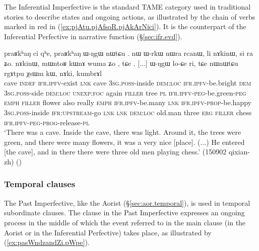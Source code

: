 The Inferential Imperfective is the standard TAME category used in traditional stories to describe states and ongoing actions, as illustrated by the chain of verbs marked in red in (\ref{ex:pjAtu.pjAfsoR.pjAkArNici}). It is the counterpart of the Inferential Perfective in narrative function  (§\ref{sec:ifr.evd}).

\begin{exe}
\ex \label{ex:pjAtu.pjAfsoR.pjAkArNici}
\gll praʁkʰaŋ ci  qʰe, praʁkʰaŋ ɯ-ŋgɯ nɯtɕu . nɯ ɯ-rkɯ nɯra rcanɯ, li nɤkinɯ, si ra  ʑo. nɤkinɯ, mɯntoʁ kɯnɤ wuma ʑo , tɕe . [...] ɯ-ŋgɯ lo-ɕe ri, tɕe nɯnɯtɕu rgɤtpu χsɯm kɯ, nɤki, kumbrɤl  \\
cave \textsc{indef} \textsc{ifr}.\textsc{ipfv}-exist \textsc{lnk} cave \textsc{3sg}.\textsc{poss}-inside \textsc{dem}:\textsc{loc} \textsc{ifr}.\textsc{ipfv}-be.bright \textsc{dem} \textsc{3sg}.\textsc{poss}-side \textsc{dem}:\textsc{loc} \textsc{unexp}:\textsc{foc} again \textsc{filler} tree \textsc{pl} \textsc{ifr}.\textsc{ipfv}-\textsc{peg}-be.green-\textsc{peg} \textsc{emph} \textsc{filler} flower also really \textsc{emph} \textsc{ifr}.\textsc{ipfv}-be.many \textsc{lnk} \textsc{ifr}.\textsc{ipfv}-\textsc{prop}-be.happy { } \textsc{3sg}.\textsc{poss}-inside \textsc{ifr}:\textsc{upstream}-go \textsc{lnk} \textsc{lnk} \textsc{dem}:\textsc{loc} old.man three \textsc{erg} \textsc{filler} chess \textsc{ifr}.\textsc{ipfv}-\textsc{peg}-\textsc{prog}-release-\textsc{pl} \\
\glt `There was a cave. Inside the cave, there was light. Around it, the trees were green, and there were many flowers, it was a very nice [place]. (...) He entered [the cave], and in there there were three old men playing chess.' (150902 qixian-zh)
()
\end{exe}


\subsubsection{Temporal clauses} \label{sec:pst.ifr.ipfv.temporal}
The Past Imperfective, like the Aorist (§\ref{sec:aor.temporal}), is used in temporal subordinate clauses. The clause in the Past Imperfective expresses an ongoing process in the middle of which the event referred to in the main clause (in the Aorist or in the Inferential Perfective) takes place, as illustrated by (\ref{ex:pasWndzandZi.pWpe}).

